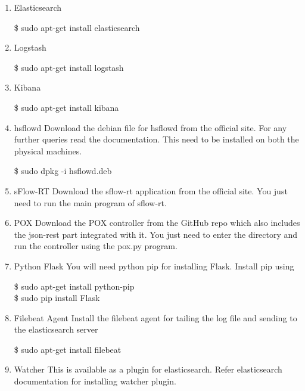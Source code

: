 \documentclass[12pt,a4paper,final]{report}
\begin{document}
\begin{enumerate}
\item
Elasticsearch
\begin{center}
\$ sudo apt-get install elasticsearch 
\end{center}

\item
Logstash
\begin{center}
\$ sudo apt-get install logstash
\end{center}

\item
Kibana
\begin{center}
\$ sudo apt-get install kibana
\end{center}

\item
hsflowd
\newline
Download the debian file for hsflowd from the official site. For any further queries read the documentation. This need to be installed on both the physical machines.
\begin{center}
\$ sudo dpkg -i hsflowd.deb
\end{center}

\item
sFlow-RT
\newline
Download the sflow-rt application from the official site. You just need to run the main program of sflow-rt.

\item
POX
\newline
Download the POX controller from the GitHub repo which also includes the json-rest  part integrated with it. You just need to enter the directory and run the controller using the pox.py program.

\item
Python Flask
\newline
You will need python pip for installing Flask. Install pip using
\begin{center}
\$ sudo apt-get install python-pip \\
\$ sudo pip install Flask
\end{center}

\item
Filebeat Agent
\newline
Install the filebeat agent for tailing the log file and sending to the elasticsearch server
\begin{center}
\$ sudo apt-get install filebeat
\end{center}

\item
Watcher
\newline
This is available as a plugin for elasticsearch. Refer elasticsearch documentation for installing watcher plugin.
\end{enumerate}
\end{document}
